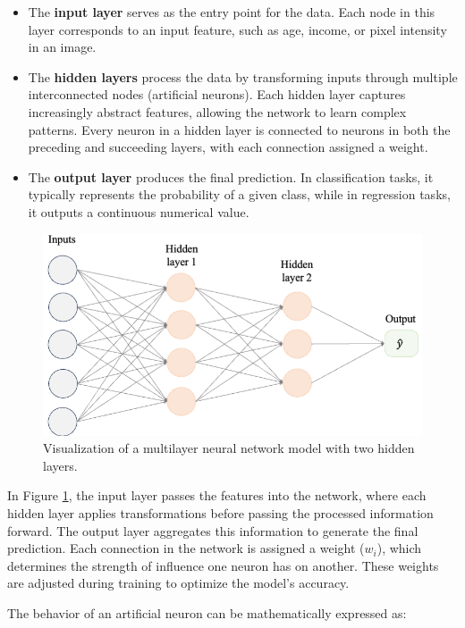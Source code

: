 \documentclass[
]{book}
\theoremstyle{definition}
\theoremstyle{definition}
\theoremstyle{definition}
\theoremstyle{definition}
\theoremstyle{remark}
\begin{document}
\begin{itemize}
\item
  The \textbf{input layer} serves as the entry point for the data. Each node in this layer corresponds to an input feature, such as age, income, or pixel intensity in an image.
\item
  The \textbf{hidden layers} process the data by transforming inputs through multiple interconnected nodes (artificial neurons). Each hidden layer captures increasingly abstract features, allowing the network to learn complex patterns. Every neuron in a hidden layer is connected to neurons in both the preceding and succeeding layers, with each connection assigned a weight.
\item
  The \textbf{output layer} produces the final prediction. In classification tasks, it typically represents the probability of a given class, while in regression tasks, it outputs a continuous numerical value.
\end{itemize}

\begin{figure}

{\centering \includegraphics[width=0.8\linewidth]{images/net_large} 

}

\caption{Visualization of a multilayer neural network model with two hidden layers.}\label{fig:net-large}
\end{figure}

In Figure \ref{fig:net-large}, the input layer passes the features into the network, where each hidden layer applies transformations before passing the processed information forward. The output layer aggregates this information to generate the final prediction. Each connection in the network is assigned a weight (\(w_i\)), which determines the strength of influence one neuron has on another. These weights are adjusted during training to optimize the model's accuracy.

The behavior of an artificial neuron can be mathematically expressed as:
\end{document}

